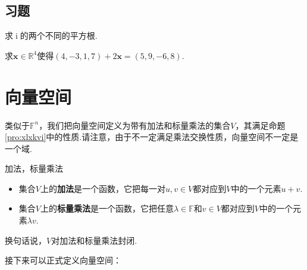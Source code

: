 \documentclass[lang=cn, zihao=5]{elegantbook}
\newcommand{\R}{\mathbb{R}}
\newcommand{\F}{\mathbb{F}}
\DeclareMathOperator{\ic}{i}
\begin{document}
\subsection*{习题}
\begin{exercise}
	求$\ic $的两个不同的平方根.
\end{exercise}
\begin{exercise}
	求$\boldsymbol{x} \in \R ^{4}$使得$(4,-3,1,7) + 2\boldsymbol{x} = (5,9,-6,8)$.
\end{exercise}


\newpage
\section{向量空间}

类似于$\F ^{n}$，我们把向量空间定义为带有加法和标量乘法的集合$V$，其满足命题\ref{pro:xlxkvi}中的性质.请注意，由于不一定满足乘法交换性质，向量空间不一定是一个域.

\begin{definition}{加法，标量乘法}
	\begin{itemize}
		\item 集合$V$上的\textbf{加法}是一个函数，它把每一对$u,v \in V$都对应到$V$中的一个元素$u+v$.
		\item 集合$V$上的\textbf{标量乘法}是一个函数，它把任意$\lambda \in \F $和$v \in V$都对应到$V$中的一个元素$\lambda v$.
	\end{itemize}
\end{definition}
\begin{remark}
	换句话说，$V$对加法和标量乘法封闭.
\end{remark}

接下来可以正式定义向量空间：
\end{document}
